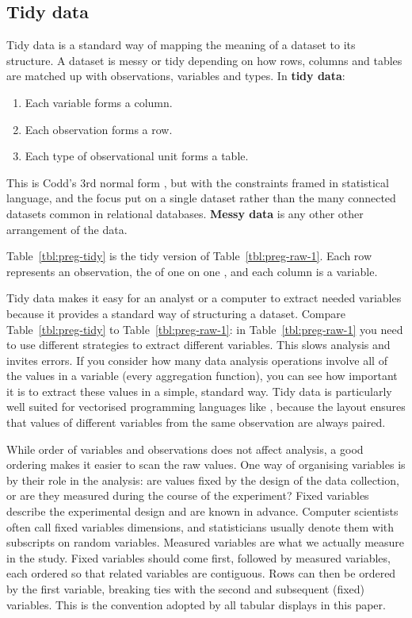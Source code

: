 \documentclass[article]{jss}
\begin{document}
\subsection{Tidy data}

Tidy data is a standard way of mapping the meaning of a dataset to its structure. A dataset is messy or tidy depending on how rows, columns and tables are matched up with observations, variables and types. In \textbf{tidy data}:

\begin{enumerate}
  \item Each variable forms a column.
  \item Each observation forms a row.
  \item Each type of observational unit forms a table.
\end{enumerate}

\noindent This is Codd's 3rd normal form \citep{codd:1990}, but with the constraints framed in statistical language, and the focus put on a single dataset rather than the many connected datasets common in relational databases. \textbf{Messy data} is any other other arrangement of the data. 

Table~\ref{tbl:preg-tidy} is the tidy version of Table~\ref{tbl:preg-raw-1}. Each row represents an observation, the  of one  on one , and each column is a variable.

Tidy data makes it easy for an analyst or a computer to extract needed variables because it provides a standard way of structuring a dataset. Compare Table~\ref{tbl:preg-tidy} to Table~\ref{tbl:preg-raw-1}: in Table~\ref{tbl:preg-raw-1} you need to use different strategies to extract different variables. This slows analysis and invites errors. If you consider how many data analysis operations involve all of the values in a variable (every aggregation function), you can see how important it is to extract these values in a simple, standard way. Tidy data is particularly well suited for vectorised programming languages like , because the layout ensures that values of different variables from the same observation are always paired.

While order of variables and observations does not affect analysis, a good ordering makes it easier to scan the raw values. One way of organising variables is by their role in the analysis: are values fixed by the design of the data collection, or are they measured during the course of the experiment? Fixed variables describe the experimental design and are known in advance. Computer scientists often call fixed variables dimensions, and statisticians usually denote them with subscripts on random variables. Measured variables are what we actually measure in the study. Fixed variables should come first, followed by measured variables, each ordered so that related variables are contiguous. Rows can then be ordered by the first variable, breaking ties with the second and subsequent (fixed) variables. This is the convention adopted by all tabular displays in this paper. 
\end{document}
